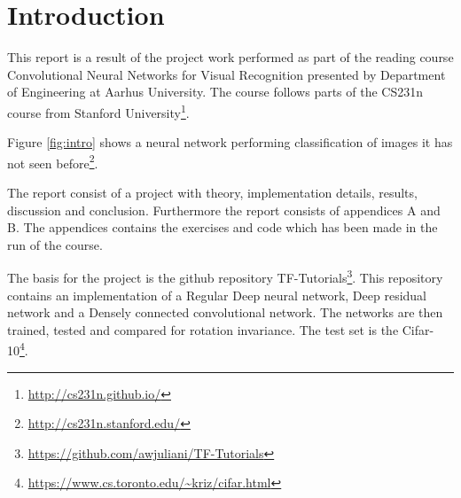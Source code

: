 \chapter{Introduction}
\label{chp:intro}
This report is a result of the project work performed as part of the reading course Convolutional Neural Networks for Visual Recognition presented by Department of Engineering at Aarhus University. The course follows parts of the CS231n course from Stanford University\footnote{\url{http://cs231n.github.io/}}.


Figure \ref{fig:intro} shows a neural network performing classification of images it has not seen before\footnote{\url{http://cs231n.stanford.edu/}}.

The report consist of a project with theory, implementation details, results, discussion and conclusion. Furthermore the report consists of appendices A and B. The appendices contains the exercises and code which has been made in the run of the course.

The basis for the project is the github repository TF-Tutorials\footnote{\url{https://github.com/awjuliani/TF-Tutorials}}. This repository contains an implementation of a Regular Deep neural network, Deep residual network and a Densely connected convolutional network. The networks are then trained, tested and compared for rotation invariance. The test set is the Cifar-10\footnote{\url{https://www.cs.toronto.edu/~kriz/cifar.html}}.

